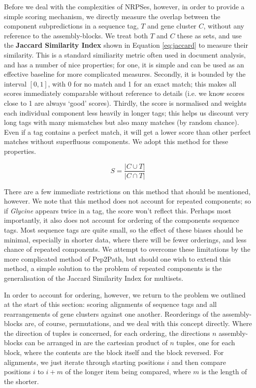 \documentclass{l4proj}
\newcommand{\cit}[1]{\citep{#1}}
\newcommand{\jaccard}{
	\begin{equation} \label{eq:jaccard}
		S = \dfrac{|C\cup{T}|}{|C\cap{T}|}
	\end{equation}
}
\begin{document}
Before we deal with the complexities of NRPSes, however, in order to provide a simple scoring mechanism, we directly measure the overlap between the component subpredictions in a sequence tag, \(T\) and gene cluster \(C\), without any reference to the assembly-blocks. We treat both \(T\) and \(C\) these as sets, and use the \textbf{Jaccard Similarity Index} \cit{jaccard} shown in Equation \ref{eq:jaccard} to measure their similarity. This is a standard similiarity metric often used in document analysis, and has a number of nice properties; for one, it is simple and can be used as an effective baseline for more complicated measures. Secondly, it is bounded by the interval \([0, 1]\), with 0 for no match and 1 for an exact match; this makes all scores immediately comparable without reference to details (i.e. we know scores close to 1 are always `good' scores). Thirdly, the score is normalised and weights each individual component less heavily in longer tags; this helps us discount very long tags with many mismatches but also many matches (by random chance). Even if a tag contains a perfect match, it will get a lower score than other perfect matches without superfluous components. We adopt this method for these properties.

\jaccard

There are a few immediate restrictions on this method that should be mentioned, however. We note that this method does not account for repeated components; so if \textit{Glycine} appears twice in a tag, the score won't reflect this. Perhaps most importantly, it also does not account for ordering of the components sequence tags. Most sequence tags are quite small, so the effect of these biases should be minimal, especially in shorter data, where there will be fewer orderings, and less chance of repeated components. We attempt to overcome these limitations by the more complicated method of Pep2Path, but should one wish to extend this method, a simple solution to the problem of repeated components is the generalisation of the Jaccard Similarity Index for multisets.

In order to account for ordering, however, we return to the problem we outlined at the start of this section: scoring alignments of sequence tags and all rearrangements of gene clusters against one another. Reorderings of the assembly-blocks are, of course, permutations, and we deal with this concept directly. Where the direction of tuples is concerned, for each ordering, the directions \(n\) assembly-blocks can be arranged in are the cartesian product of \(n\) tuples, one for each block, where the contents are the block itself and the block reversed. For alignments, we just iterate through starting positions \(i\) and then compare positions \(i\) to \(i + m\) of the longer item being compared, where \(m\) is the length of the shorter.
\end{document}

